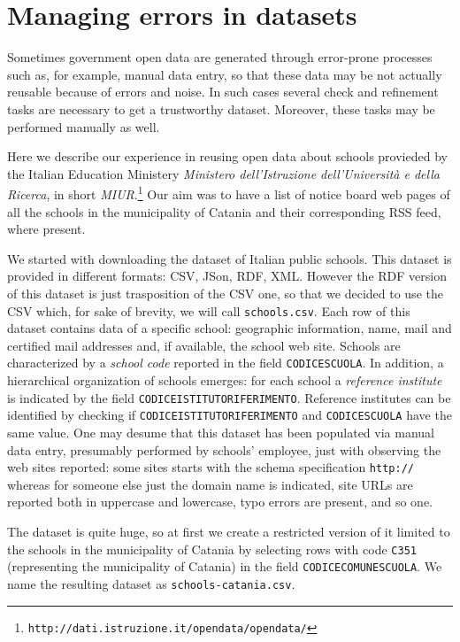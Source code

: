 \documentclass{article}
\begin{document}
\section{Managing errors in datasets}

Sometimes government open data are generated through error-prone processes such as, for example, 
manual data entry, so that these data may be not actually reusable because of errors and noise. In such cases 
several check and refinement tasks are necessary to get a trustworthy dataset. Moreover, these tasks
may be performed manually as well. 

Here we describe our experience in reusing open data about schools provieded by the Italian Education Ministery 
\emph{Ministero dell'Istruzione dell'Universit\`a e della Ricerca}, in short \emph{MIUR}.\footnote{\texttt{http://dati.istruzione.it/opendata/opendata/}}
Our aim was to have a list of notice board web pages of all the schools in the municipality of Catania and
their corresponding RSS feed, where present. 

We started with downloading the dataset of Italian public schools.
This dataset is provided in different formats: CSV, JSon, RDF, XML. However the RDF version of this dataset is just 
trasposition of the CSV one, so that we decided to use the CSV which, for sake of brevity, we will call \texttt{schools.csv}.
Each row of this dataset contains data of a specific school: geographic information, name, mail and certified mail addresses and, if available, the school 
web site. Schools are characterized by a \emph{school code} reported in the field \texttt{CODICESCUOLA}.
In addition, a hierarchical organization of schools emerges: for each school a \emph{reference institute} is
indicated by the field \texttt{CODICEISTITUTORIFERIMENTO}. Reference institutes can be identified by checking
if \texttt{CODICEISTITUTORIFERIMENTO} and \texttt{CODICESCUOLA} have the same value. 
One may desume that this dataset has been populated via manual data entry, presumably performed by schools' employee, 
just with observing the web sites reported: some sites starts with the schema specification \texttt{http://} whereas for someone 
else just the domain name is indicated, site URLs are reported both in uppercase and lowercase, typo errors 
are present, and so one.

The dataset is quite huge, so at first we create a restricted version of it limited to the schools in the municipality 
of Catania by selecting rows with code \texttt{C351} (representing the municipality of Catania) in the field 
\texttt{CODICECOMUNESCUOLA}. We name the resulting dataset as \texttt{schools-catania.csv}. 
\end{document}
